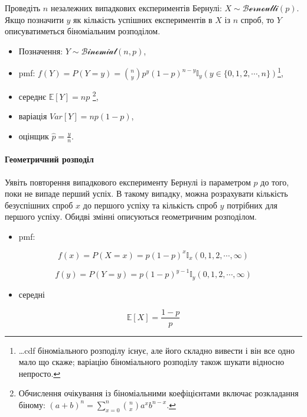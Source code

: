 \documentclass[
  11pt,
]{book}
\providecommand{\tightlist}{%
  \setlength{\itemsep}{0pt}\setlength{\parskip}{0pt}}
\begin{document}
Проведіть \(n\) незалежних випадкових експериментів Бернулі: \(X \sim \mathcal{Bernoulli}(p)\). Якщо позначити \(y\) як кількість успішних експериментів в \(X\) із \(n\) спроб, то \(Y\) описуватиметься біноміальним розподілом.

\begin{itemize}
\item
  Позначення: \(Y \sim \mathcal{Binomial}(n, p)\),
\item
  pmf: \(f(Y) = P(Y = y) = \binom{n}{y} p^y (1-p)^{n - y} \mathbb{I}_y (y \in \{0, 1, 2, \cdots, n\})\)\footnote{\ldots cdf біноміального розподілу існує, але його складно вивести і він все одно мало що скаже; варіацію біноміального розподілу також шукати відносно непросто.},
\item
  середнє \(\mathbb{E} [Y] = np\) \footnote{Обчислення очікування із біноміальними коефіцієнтами включає розкладання біному: \((a + b)^n = \sum \limits_{x = 0}^n \binom{n}{x} a^x b^{n - x}\).},
\item
  варіація \(Var[Y] = np(1-p)\),
\item
  оцінщик \(\hat{p} = \frac{y}{n}\).
\end{itemize}

\paragraph{Геометричний розподіл}\label{ux433ux435ux43eux43cux435ux442ux440ux438ux447ux43dux438ux439-ux440ux43eux437ux43fux43eux434ux456ux43b}

Уявіть повторення випадкового експерименту Бернулі із параметром \(p\) до того, поки не випаде перший успіх. В такому випадку, можна розрахувати кількість безуспішних спроб \(x\) до першого успіху та кількість спроб \(y\) потрібних для першого успіху. Обидві змінні описуються геометричним розподілом.

\begin{itemize}
\tightlist
\item
  pmf:
\end{itemize}

\[f(x) = P(X = x) = p(1 - p)^x \mathbb{I}_x (0, 1, 2, \cdots, \infty)\]

\[f(y) = P(Y = y) = p(1-p)^{y-1} \mathbb{I}_y (0, 1, 2, \cdots, \infty)\]

\begin{itemize}
\tightlist
\item
  середні
\end{itemize}

\[\mathbb{E} [X] = \frac{1-p}{p}\]
\end{document}
